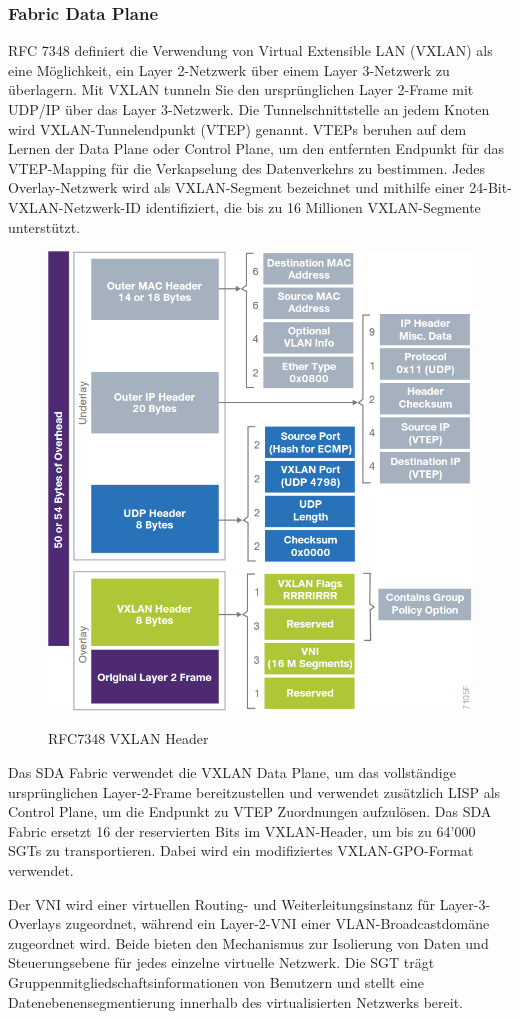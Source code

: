\subsubsection{Fabric Data Plane}
RFC 7348 definiert die Verwendung von Virtual Extensible LAN (VXLAN) als eine Möglichkeit, ein Layer 2-Netzwerk über einem Layer 3-Netzwerk zu überlagern. Mit VXLAN tunneln Sie den ursprünglichen Layer 2-Frame mit UDP/IP über das Layer 3-Netzwerk. Die Tunnelschnittstelle an jedem Knoten wird VXLAN-Tunnelendpunkt (VTEP) genannt. VTEPs beruhen auf dem Lernen der Data Plane oder Control Plane, um den entfernten Endpunkt für das VTEP-Mapping für die Verkapselung des Datenverkehrs zu bestimmen. Jedes Overlay-Netzwerk wird als VXLAN-Segment bezeichnet und mithilfe einer 24-Bit-VXLAN-Netzwerk-ID identifiziert, die bis zu 16 Millionen VXLAN-Segmente unterstützt.

\begin{figure}[H]
	\centering
	\includegraphics[width=0.7\linewidth]{img/RFC7348-VXLAN-Header.png}\\[1px]
	\caption{RFC7348 VXLAN Header}
	\label{fig:RFC7348 VXLAN Header}
\end{figure}

Das SDA Fabric verwendet die VXLAN Data Plane, um das vollständige ursprünglichen Layer-2-Frame bereitzustellen und verwendet zusätzlich LISP als Control Plane, um die Endpunkt zu VTEP Zuordnungen aufzulösen. Das SDA Fabric ersetzt 16 der reservierten Bits im VXLAN-Header, um bis zu 64'000 SGTs zu transportieren. Dabei wird ein modifiziertes VXLAN-GPO-Format verwendet.

Der VNI wird einer virtuellen Routing- und Weiterleitungsinstanz für Layer-3-Overlays zugeordnet, während ein Layer-2-VNI einer VLAN-Broadcastdomäne zugeordnet wird. Beide bieten den Mechanismus zur Isolierung von Daten und Steuerungsebene für jedes einzelne virtuelle Netzwerk. Die SGT trägt Gruppenmitgliedschaftsinformationen von Benutzern und stellt eine Datenebenensegmentierung innerhalb des virtualisierten Netzwerks bereit. \cite{sda-designguide}

